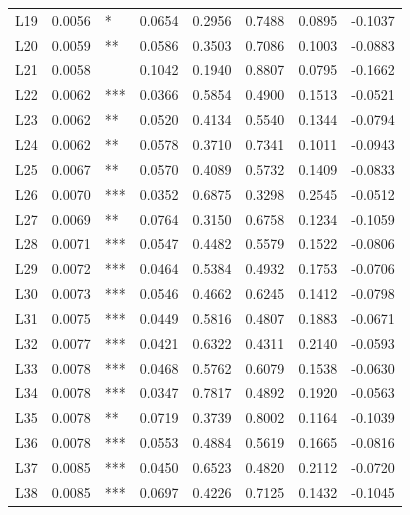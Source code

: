 \begin{tabular}{lrlrrrrr}
L19     &    0.0056 &    * &   0.0654 &  0.2956 &        0.7488 &  0.0895 &    -0.1037 \\
L20     &    0.0059 &   ** &   0.0586 &  0.3503 &        0.7086 &  0.1003 &    -0.0883 \\
L21     &    0.0058 &      &   0.1042 &  0.1940 &        0.8807 &  0.0795 &    -0.1662 \\
L22     &    0.0062 &  *** &   0.0366 &  0.5854 &        0.4900 &  0.1513 &    -0.0521 \\
L23     &    0.0062 &   ** &   0.0520 &  0.4134 &        0.5540 &  0.1344 &    -0.0794 \\
L24     &    0.0062 &   ** &   0.0578 &  0.3710 &        0.7341 &  0.1011 &    -0.0943 \\
L25     &    0.0067 &   ** &   0.0570 &  0.4089 &        0.5732 &  0.1409 &    -0.0833 \\
L26     &    0.0070 &  *** &   0.0352 &  0.6875 &        0.3298 &  0.2545 &    -0.0512 \\
L27     &    0.0069 &   ** &   0.0764 &  0.3150 &        0.6758 &  0.1234 &    -0.1059 \\
L28     &    0.0071 &  *** &   0.0547 &  0.4482 &        0.5579 &  0.1522 &    -0.0806 \\
L29     &    0.0072 &  *** &   0.0464 &  0.5384 &        0.4932 &  0.1753 &    -0.0706 \\
L30     &    0.0073 &  *** &   0.0546 &  0.4662 &        0.6245 &  0.1412 &    -0.0798 \\
L31     &    0.0075 &  *** &   0.0449 &  0.5816 &        0.4807 &  0.1883 &    -0.0671 \\
L32     &    0.0077 &  *** &   0.0421 &  0.6322 &        0.4311 &  0.2140 &    -0.0593 \\
L33     &    0.0078 &  *** &   0.0468 &  0.5762 &        0.6079 &  0.1538 &    -0.0630 \\
L34     &    0.0078 &  *** &   0.0347 &  0.7817 &        0.4892 &  0.1920 &    -0.0563 \\
L35     &    0.0078 &   ** &   0.0719 &  0.3739 &        0.8002 &  0.1164 &    -0.1039 \\
L36     &    0.0078 &  *** &   0.0553 &  0.4884 &        0.5619 &  0.1665 &    -0.0816 \\
L37     &    0.0085 &  *** &   0.0450 &  0.6523 &        0.4820 &  0.2112 &    -0.0720 \\
L38     &    0.0085 &  *** &   0.0697 &  0.4226 &        0.7125 &  0.1432 &    -0.1045 \\

\end{tabular}
